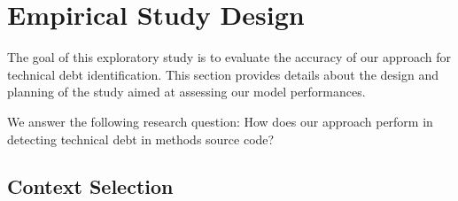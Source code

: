 \chapter{Empirical Study Design}


The goal of this exploratory study is to evaluate the accuracy of our approach for technical debt identification.
This section provides details about the design and planning of the study aimed at assessing our model performances.
 

We answer the following research question:
How does our approach perform in detecting technical debt in methods source code?


\section{Context Selection}
% 


%




